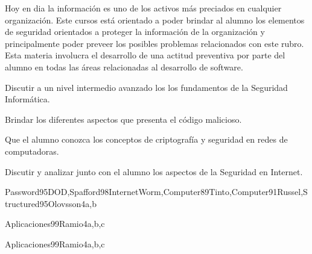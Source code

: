 \begin{syllabus}


\begin{justification}
Hoy en dia la información es uno de los activos más preciados en cualquier organización. 
Este cursos está orientado a poder brindar al alumno los elementos de seguridad orientados a proteger la 
información de la organización y principalmente poder preveer los posibles problemas relacionados con este rubro. 
Esta materia involucra el desarrollo de una actitud preventiva por parte del alumno en todas las áreas 
relacionadas al desarrollo de software.
\end{justification}

\begin{goals}
\item Discutir a un nivel intermedio avanzado los los fundamentos de la Seguridad Informática.
\item Brindar los diferentes aspectos que presenta el código malicioso.
\item Que el alumno conozca los conceptos de criptografía y seguridad en redes de computadoras.
\item Discutir y analizar junto con el alumno los aspectos de la Seguridad en Internet.
\end{goals}

\begin{outcomes}
\end{outcomes}

\begin{unit}{\PFFoundationsInformationSecurityDef}{Password95DOD,Spafford98InternetWorm,Computer89Tinto,Computer91Russel,Structured95Olovsson}{4}{a,b}
    \PFFoundationsInformationSecurityAllTopics
    \PFFoundationsInformationSecurityAllObjectives
\end{unit}

\begin{unit}{\PFSecureProgrammingDef}{Aplicaciones99Ramio}{4}{a,b,c}
    \PFSecureProgrammingAllTopics
    \PFSecureProgrammingAllObjectives
\end{unit}

\begin{unit}{\OSSecurityModelsDef}{Aplicaciones99Ramio}{4}{a,b,c}
    \OSSecurityModelsAllTopics
    \OSSecurityModelsAllObjectives
\end{unit}


\end{syllabus}
